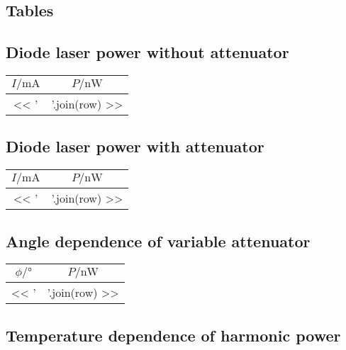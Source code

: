 \documentclass[11pt, english, fleqn, DIV=15, headinclude, BCOR=2cm]{scrreprt}
\begin{document}
\begin{appendix}
    \chapter{Tables}

    \section{Diode laser power without attenuator}

    \begin{tabular}{SS}
        \toprule
        {$I/\si{\milli\ampere}$}
        & {$P/\si{\nano\watt}$} \\
        \midrule
        << ' & '.join(row) >> \\
        \bottomrule
    \end{tabular}

    \section{Diode laser power with attenuator}

    \begin{tabular}{SS}
        \toprule
        {$I/\si{\milli\ampere}$}
        & {$P/\si{\nano\watt}$} \\
        \midrule
        << ' & '.join(row) >> \\
        \bottomrule
    \end{tabular}

    \section{Angle dependence of variable attenuator}
    \label{sec:variable_attenuator_table}

    \begin{longtable}[l]{SS}
        \toprule
        {$\phi/\si{\degree}$}
        & {$P/\si{\nano\watt}$} \\
        \midrule
        \endhead
        << ' & '.join(row) >> \\
        \bottomrule
    \end{longtable}

    \section{Temperature dependence of harmonic power}


\end{appendix}
\end{document}
